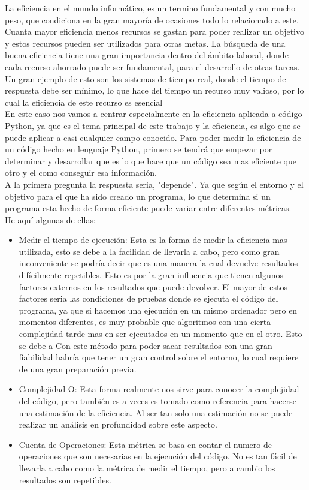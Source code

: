 
La eficiencia en el mundo informático, es un termino fundamental y con mucho peso, que condiciona en la gran mayoría de ocasiones todo lo relacionado a este. Cuanta mayor eficiencia menos recursos se gastan para poder realizar un objetivo y estos recursos pueden ser utilizados para otras metas. 
La búsqueda de una buena eficiencia tiene una gran importancia dentro del ámbito laboral, donde cada recurso ahorrado puede ser fundamental, para el desarrollo de otras tareas. Un gran ejemplo de esto son los sistemas de tiempo real, donde el tiempo de respuesta debe ser mínimo, lo que hace del tiempo un recurso muy valioso, por lo cual la eficiencia de este recurso es esencial\\

En este caso nos vamos a centrar especialmente en la eficiencia aplicada a código Python, ya que es el tema principal de este trabajo y la eficiencia, es algo que se puede aplicar a casi cualquier campo conocido.
Para poder medir la eficiencia de un código hecho en lenguaje Python, primero se tendrá que empezar por determinar y desarrollar que es lo que hace que un código sea mas eficiente que otro y el como conseguir esa información.\\

A la primera pregunta la respuesta seria, "depende". Ya que según el entorno y el objetivo para el que ha sido creado un programa, lo que determina si un programa esta hecho de forma eficiente puede variar entre diferentes métricas.\\ 

He aquí algunas de ellas:
\begin{itemize}
	\item Medir el tiempo de ejecución: Esta es la forma de medir la eficiencia mas utilizada, esto se debe a la facilidad de llevarla a cabo, pero como gran inconveniente se podría decir que es una manera la cual devuelve resultados difícilmente repetibles. Esto es por la gran influencia que tienen algunos factores externos en los resultados que puede devolver. El mayor de estos factores seria las condiciones  de pruebas donde se ejecuta el código del programa, ya que si hacemos una ejecución en un mismo ordenador pero en momentos diferentes, es muy probable que algoritmos con una cierta complejidad tarde mas en ser ejecutados en un momento que en el otro. Esto se debe a Con este método para poder sacar resultados con una gran fiabilidad habría que tener un gran control sobre el entorno, lo cual requiere de una gran preparación previa.
	\item Complejidad O: Esta forma realmente nos sirve  para conocer la complejidad del código, pero también es a veces es tomado como referencia para hacerse una estimación de la eficiencia. Al ser tan solo una estimación no se puede realizar un análisis en profundidad sobre este aspecto.
	\item Cuenta de Operaciones: Esta métrica se basa en contar el numero de operaciones que son necesarias en la ejecución del código. No es tan fácil de llevarla a cabo como la métrica de medir el tiempo, pero a cambio los resultados son repetibles.

\end{itemize}

